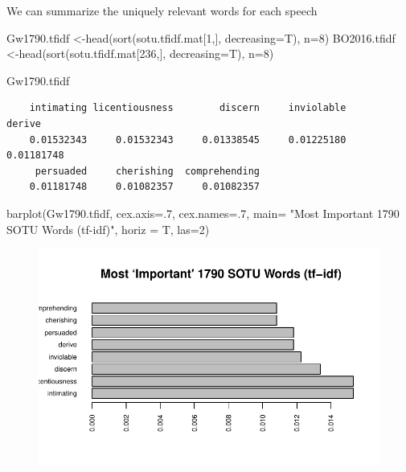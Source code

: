 \documentclass[
  letterpaper,
  DIV=11,
  numbers=noendperiod]{scrreprt}
\newenvironment{Shaded}{\begin{snugshade}}{\end{snugshade}}
\newcommand{\AttributeTok}[1]{\textcolor[rgb]{0.40,0.45,0.13}{#1}}
\newcommand{\DecValTok}[1]{\textcolor[rgb]{0.68,0.00,0.00}{#1}}
\newcommand{\FunctionTok}[1]{\textcolor[rgb]{0.28,0.35,0.67}{#1}}
\newcommand{\NormalTok}[1]{\textcolor[rgb]{0.00,0.23,0.31}{#1}}
\newcommand{\OtherTok}[1]{\textcolor[rgb]{0.00,0.23,0.31}{#1}}
\newcommand{\StringTok}[1]{\textcolor[rgb]{0.13,0.47,0.30}{#1}}
\begin{document}
We can summarize the uniquely relevant words for each speech

\begin{Shaded}
\begin{Highlighting}[]
\NormalTok{Gw1790.tfidf }\OtherTok{\textless{}{-}}\FunctionTok{head}\NormalTok{(}\FunctionTok{sort}\NormalTok{(sotu.tfidf.mat[}\DecValTok{1}\NormalTok{,], }\AttributeTok{decreasing=}\NormalTok{T), }\AttributeTok{n=}\DecValTok{8}\NormalTok{)}
\NormalTok{BO2016.tfidf }\OtherTok{\textless{}{-}}\FunctionTok{head}\NormalTok{(}\FunctionTok{sort}\NormalTok{(sotu.tfidf.mat[}\DecValTok{236}\NormalTok{,], }\AttributeTok{decreasing=}\NormalTok{T), }\AttributeTok{n=}\DecValTok{8}\NormalTok{)}
\end{Highlighting}
\end{Shaded}

\begin{Shaded}
\begin{Highlighting}[]
\NormalTok{Gw1790.tfidf}
\end{Highlighting}
\end{Shaded}

\begin{verbatim}
    intimating licentiousness        discern     inviolable         derive 
    0.01532343     0.01532343     0.01338545     0.01225180     0.01181748 
     persuaded     cherishing  comprehending 
    0.01181748     0.01082357     0.01082357 
\end{verbatim}

\begin{Shaded}
\begin{Highlighting}[]
\FunctionTok{barplot}\NormalTok{(Gw1790.tfidf, }\AttributeTok{cex.axis=}\NormalTok{.}\DecValTok{7}\NormalTok{,}
         \AttributeTok{cex.names=}\NormalTok{.}\DecValTok{7}\NormalTok{,}
        \AttributeTok{main=} \StringTok{"Most \textasciigrave{}Important\textquotesingle{} 1790 SOTU Words (tf{-}idf)"}\NormalTok{, }
        \AttributeTok{horiz =}\NormalTok{ T, }\AttributeTok{las=}\DecValTok{2}\NormalTok{)}
\end{Highlighting}
\end{Shaded}

\begin{figure}[H]

{\centering \includegraphics{11-TextasData_files/figure-pdf/unnamed-chunk-15-1.pdf}

}

\end{figure}
\end{document}
